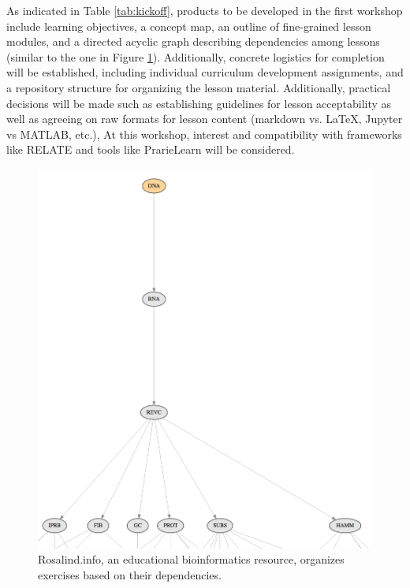 \documentclass[11pt]{article}
\begin{document}
          As indicated in Table \ref{tab:kickoff}, products to be developed in 
          the first workshop include learning 
          objectives\cite{bloom_bloom_1984}, a concept 
          map\cite{novak_concept_1990}, 
          an outline of fine-grained lesson modules, and a 
          directed acyclic graph describing dependencies among lessons (similar 
          to the one in Figure \ref{fig:rosalind}). Additionally, concrete logistics 
          for completion will be established, including individual curriculum 
          development assignments, and a repository structure for organizing 
          the lesson material. Additionally, practical decisions will be made 
          such as establishing guidelines for lesson acceptability as well as 
          agreeing on raw formats for lesson content (markdown vs. \LaTeX, 
          Jupyter vs MATLAB, etc.),  At this workshop, interest and 
          compatibility with frameworks like RELATE 
          \cite{kloeckner_relate_2017,kloeckner_relate_2017-1} and tools like 
          PrarieLearn \cite{west_prairielearn:_2015} will be considered.

\begin{figure}[ht!]
        \begin{center}
                \includegraphics[height=0.5\textheight]{rosalind.png}
        \end{center}
        \caption{Rosalind.info, an educational bioinformatics resource, 
        organizes exercises based on their dependencies.}
        \label{fig:rosalind}
\end{figure}
          
\end{document}
